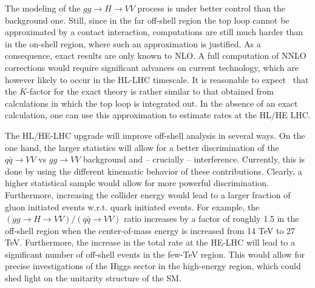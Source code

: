The modeling of the $gg\to H\to VV$ process is under better control than the background one. 
Still, since
in the far off-shell region the top loop cannot be approximated by a contact interaction,
computations are still much harder than in the on-shell region, where such an approximation is justified. As a consequence, exact results are
only known to NLO. A full computation of NNLO corrections would require significant advances on 
current technology, which are however likely to occur in the HL-LHC timescale. It is reasonable
to expect~\cite{deFlorian:2016spz} 
that the $K$-factor for the exact theory is rather similar to that obtained from calculations in which
the top loop is integrated out. In the absence of an exact calculation, one can use this 
approximation to estimate rates at the HL/HE LHC. 

The HL/HE-LHC upgrade will improve off-shell analysis in several ways. On the one hand,
the larger statistics will allow for a better discrimination of the $q\bar q\to VV$ vs
$gg\to VV$ background and -- crucially -- interference. Currently, this is done by using
the different kinematic behavior of these contributions. Clearly, a higher statistical
sample would allow for more powerful discrimination. Furthermore, increasing the collider
energy would lead to a larger fraction of gluon initiated events w.r.t. quark initiated
events. For example, the $(gg\to H\to VV)/(q\bar q\to VV)$ ratio increases by a factor of roughly
1.5 in the off-shell region when the center-of-mass energy is increased from 14 TeV to 27 TeV. Furthermore, the increase in the total rate at the HE-LHC
will lead to a significant number of off-shell events in the few-TeV region. This would
allow for precise investigations of the Higgs sector in the high-energy region, which could 
shed light on the unitarity structure of the SM. 
